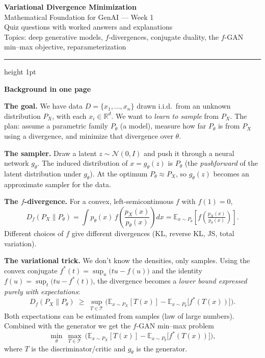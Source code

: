 \documentclass[11pt]{article}
\begin{document}
\begin{center}
  {\Huge\bfseries\color{ink}Variational Divergence Minimization}\\[4pt]
  {\large\color{accent} Mathematical Foundation for GenAI — Week 1}\\[6pt]
  {\small Quiz questions with worked answers and explanations}\\[2pt]
  {\footnotesize Topics: deep generative models, $f$-divergences, conjugate duality, the $f$-GAN min--max objective, reparameterization}
\end{center}

\vspace{0.3em}
\hrule height 1pt
\vspace{0.6em}

{\large\bfseries\color{accent} Background in one page}\par\vspace{0.3em}

\textbf{The goal.} We have data $D=\{x_1,\dots,x_n\}$ drawn i.i.d.\ from an unknown distribution $P_X$, with each $x_i\in\mathbb{R}^d$. We want to \emph{learn to sample} from $P_X$. The plan: assume a parametric family $P_\theta$ (a model), measure how far $P_\theta$ is from $P_X$ using a divergence, and minimize that divergence over $\theta$.

\textbf{The sampler.} Draw a latent $z\sim\mathcal{N}(0,I)$ and push it through a neural network $g_\theta$. The induced distribution of $x=g_\theta(z)$ is $P_\theta$ (the \emph{pushforward} of the latent distribution under $g_\theta$). At the optimum $P_\theta\approx P_X$, so $g_\theta(z)$ becomes an approximate sampler for the data.

\textbf{The $f$-divergence.} For a convex, left-semicontinuous $f$ with $f(1)=0$,
\[
D_f(P_X\|P_\theta)=\int p_\theta(x)\,f\!\left(\frac{p_X(x)}{p_\theta(x)}\right)dx
=\mathbb{E}_{x\sim P_\theta}\!\left[f\!\left(\tfrac{p_X(x)}{p_\theta(x)}\right)\right].
\]
Different choices of $f$ give different divergences (KL, reverse KL, JS, total variation).

\textbf{The variational trick.} We don't know the densities, only samples. Using the convex conjugate $f^*(t)=\sup_{u}\big(tu-f(u)\big)$ and the identity $f(u)=\sup_t\big(tu-f^*(t)\big)$, the divergence becomes a \emph{lower bound expressed purely with expectations}:
\[
D_f(P_X\|P_\theta)\;\ge\;\sup_{T\in\mathcal{T}}\Big(\mathbb{E}_{x\sim P_X}[T(x)]-\mathbb{E}_{x\sim P_\theta}\big[f^*(T(x))\big]\Big).
\]
Both expectations can be estimated from samples (law of large numbers). Combined with the generator we get the $f$-GAN min--max problem
\[
\min_\theta\ \max_{T\in\mathcal{T}}\ \Big(\mathbb{E}_{x\sim P_X}[T(x)]-\mathbb{E}_{x\sim P_\theta}\big[f^*(T(x))\big]\Big),
\]
where $T$ is the discriminator/critic and $g_\theta$ is the generator.
\end{document}
